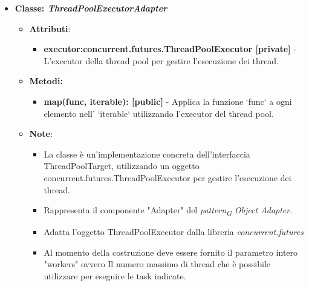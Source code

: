 \begin{itemize}
\begin{itemize}
\begin{itemize}
    \end{itemize}
    \end{itemize}
    \item{\textbf{Classe: \textit{ThreadPoolExecutorAdapter}}}
    \begin{itemize}
    \item\textbf{Attributi}:
        \begin{itemize}
        \item \textbf{executor:concurrent.futures.ThreadPoolExecutor [private]} - L'executor della thread pool per gestire l'esecuzione dei thread.
    \end{itemize}
    \item \textbf{Metodi: }
    \begin{itemize}
        \item \textbf{map(func, iterable): [public]} - Applica la funzione `func` a ogni elemento nell' `iterable` utilizzando l'executor del thread pool.
    \end{itemize}
    \item\textbf{Note}:
        \begin{itemize}
            \item La classe è un'implementazione concreta dell'interfaccia ThreadPoolTarget, utilizzando un oggetto concurrent.futures.ThreadPoolExecutor per gestire l'esecuzione dei thread.
            \item Rappresenta il componente "Adapter" del \textit{pattern}\textsubscript{\textit{G}} \textit{Object Adapter}.
            \item Adatta l'oggetto ThreadPoolExecutor dalla libreria \textit{concurrent.futures}
            \item Al momento della costruzione deve essere fornito il parametro intero "workers" ovvero
            Il numero massimo di thread che è possibile utilizzare per eseguire le task indicate.
        \end{itemize}
    \end{itemize}




\end{itemize}


